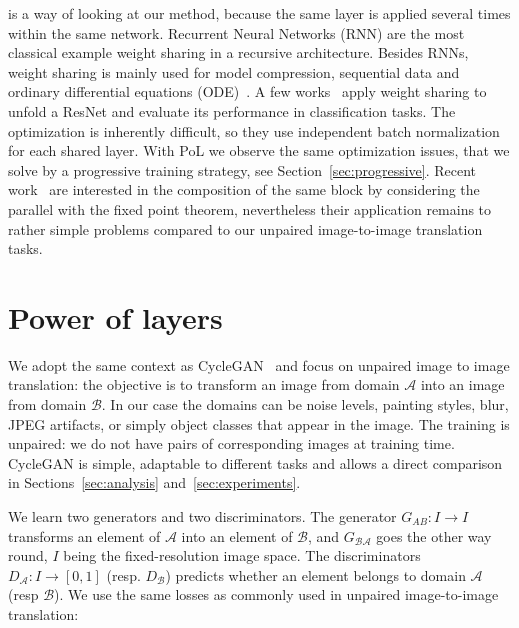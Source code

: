 \documentclass[a4paper,10pt]{extarticle}
\makeatletter
\def\Ac{\mathcal A}
\def\Bc{\mathcal B}
\renewcommand{\paragraph}{\@startsection{paragraph}{4}{\z@}{0em}{-0.5em}{\normalfont\normalsize\bfseries}}
\makeatother
\begin{document}
\paragraph{Weight sharing}
is a way of looking at our method, because the same layer is applied several times within the same network.
Recurrent Neural Networks (RNN) are the most classical example weight sharing in a recursive architecture.
Besides RNNs, weight sharing is mainly used for model compression, sequential data and ordinary differential equations (ODE)~\cite{Gao2019CrossDM,Polino2018ModelCV,Han2015DeepCC,Chen2018NeuralOD}. 
A few works~\cite{Jastrzebski2017ResidualCE,Zhang2018RecurrentCA} apply weight sharing to unfold a ResNet and evaluate its performance in classification tasks.
The optimization is inherently difficult, so they use independent batch normalization for each shared layer.
With PoL we observe the same optimization issues, that we solve by a progressive training strategy, see Section~\ref{sec:progressive}.
Recent work~\cite{Jeon2020DifferentiableFI} are interested in the composition of the same block by considering the parallel with the fixed point theorem, nevertheless their application remains to rather simple problems compared to our unpaired image-to-image translation tasks. 
 \section{Power of layers}\label{sec:method}

\newcommand\norm[1]{\left\lVert#1\right\rVert}
We adopt the same context as CycleGAN~\cite{Zhu2017CycleGAN} and focus on unpaired image to image translation: the objective is to transform an image from domain $\Ac$ into an image from domain $\Bc$.
In our case the domains can be noise levels, painting styles, blur, JPEG artifacts, or simply object classes that appear in the image.
The training is unpaired: we do not have pairs of corresponding images at training time. 
CycleGAN is simple, adaptable to different tasks and allows a direct comparison in Sections~\ref{sec:analysis} and~\ref{sec:experiments}. 

We learn two generators and two discriminators.
The generator $G_{AB}: I \rightarrow I$ transforms an element of $\Ac$ into an element of $\Bc$, and $G_{\Bc\Ac}$ goes the other way round, $I$ being the fixed-resolution image space.
The discriminators $D_{\Ac}: I \rightarrow [0, 1]$ (resp. $D_{\Bc}$) predicts whether an element belongs to domain $\Ac$ (resp $\Bc$).
We use the same losses as commonly used in unpaired image-to-image translation:
\end{document}

